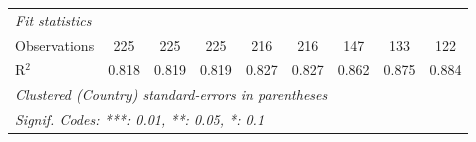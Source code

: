 \begin{tabular}{lcccccccc}
   \midrule \emph{Fit statistics}\\
   Observations                                                        & 225           & 225           & 225           & 216           & 216           & 147     & 133          & 122\\  
   R$^2$                                                               & 0.818         & 0.819         & 0.819         & 0.827         & 0.827         & 0.862   & 0.875        & 0.884\\  
   \midrule
   \multicolumn{9}{l}{\emph{Clustered (Country) standard-errors in parentheses}}\\
   \multicolumn{9}{l}{\emph{Signif. Codes: ***: 0.01, **: 0.05, *: 0.1}}\\
\end{tabular}
\par\endgroup



